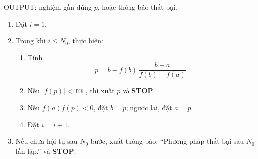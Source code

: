 OUTPUT: nghiệm gần đúng $p$, hoặc thông báo thất bại.

\begin{enumerate}
  \item Đặt $i = 1$.
  \item Trong khi $i \leq N_0$, thực hiện:
  \begin{enumerate}
    \item Tính
    \[
    p = b - f(b)\,\frac{b - a}{f(b) - f(a)}.
    \]
    \item Nếu $|f(p)| < \texttt{TOL}$, thì xuất $p$ và \textbf{STOP}.
    \item Nếu $f(a)f(p) < 0$, đặt $b = p$; ngược lại, đặt $a = p$.
    \item Đặt $i = i+1$.
  \end{enumerate}
  \item Nếu chưa hội tụ sau $N_0$ bước, xuất thông báo: 
  ``Phương pháp thất bại sau $N_0$ lần lặp.'' và \textbf{STOP}.
\end{enumerate}






